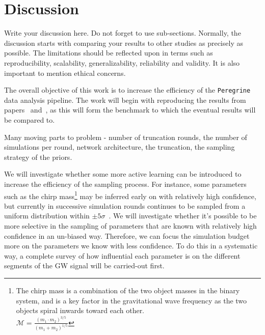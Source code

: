 \section{Discussion}
\label{sec:discussion}
Write your discussion here. Do not forget to use sub-sections. Normally, the discussion starts with comparing your results to other studies as precisely as possible. The limitations should be reflected upon in terms such as reproducibility,  scalability,  generalizability,  reliability  and  validity. It is also important to mention ethical concerns.

The overall objective of this work is to increase the efficiency of the \texttt{Peregrine} data analysis pipeline. The work will begin with reproducing the results from papers~\cite{bhardwaj2023peregrine} and~\cite{alvey2023things}, as this will form the benchmark to which the eventual results will be compared to.

Many moving parts to problem - number of truncation rounds, the number of simulations per round, network architecture, the truncation, the sampling strategy of the priors.

We will investigate whether some more active learning can be introduced to increase the efficiency of the sampling process. For instance, some parameters such as the chirp mass\footnote{The chirp mass is a combination of the two object masses in the binary system, and is a key factor in the gravitational wave frequency as the two objects spiral inwards toward each other.\\$\mathcal{M} = \frac{(m_1 \cdot m_2)^{3/5}}{(m_1 + m_2)^{1/5}}$} may be inferred early on with relatively high confidence, but currently in successive simulation rounds continues to be sampled from a uniform distribution within $\pm5\sigma$~\cite{Miller_TMNRE_2021}. We will investigate whether it's possible to be more selective in the sampling of parameters that are known with relatively high confidence in an un-biased way. Therefore, we can focus the simulation budget more on the parameters we know with less confidence. To do this in a systematic way, a complete survey of how influential each parameter is on the different segments of the GW signal will be carried-out first.


